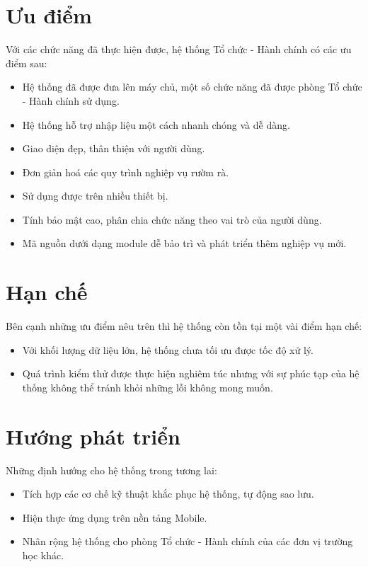 \section{Ưu điểm}
Với các chức năng đã thực hiện được, hệ thống Tổ chức - Hành chính có các ưu điểm sau:
\begin{itemize}
    \item Hệ thống đã được đưa lên máy chủ, một số chức năng đã được phòng Tổ chức - Hành chính sử dụng.
    \item Hệ thống hỗ trợ nhập liệu một cách nhanh chóng và dễ dàng.
    \item Giao diện đẹp, thân thiện với người dùng.
    \item Đơn giản hoá các quy trình nghiệp vụ rườm rà.
    \item Sử dụng được trên nhiều thiết bị.
    \item Tính bảo mật cao, phân chia chức năng theo vai trò của người dùng.
    \item Mã nguồn dưới dạng module dễ bảo trì và  phát triển thêm nghiệp vụ mới.
\end{itemize}
\section{Hạn chế}
Bên cạnh những ưu điểm nêu trên thì hệ thống còn tồn tại một vài điểm hạn chế:
\begin{itemize}
    \item Với khối lượng dữ liệu lớn, hệ thống chưa tối ưu được tốc độ xử lý.
    \item Quá trình kiểm thử được thực hiện nghiêm túc nhưng với sự phúc tạp của hệ thống không thể tránh khỏi những lỗi không mong muốn.
\end{itemize}
\section{Hướng phát triển}
Những định hướng cho hệ thống trong tương lai:
\begin{itemize}
    \item Tích hợp các cơ chế kỹ thuật khắc phục hệ thống, tự động sao lưu.
    \item Hiện thực ứng dụng trên nền tảng Mobile.
    \item Nhân rộng hệ thống cho phòng Tổ chức - Hành chính của các đơn vị trường học khác.
\end{itemize}
